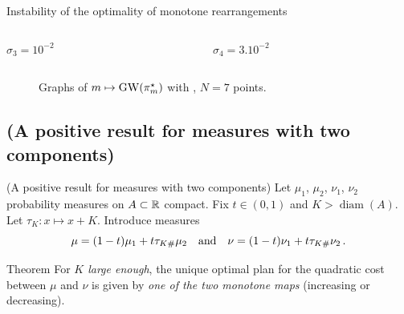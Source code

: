\documentclass[9pt,xcolor={dvipsnames}]{beamer}
\begin{document}
\begin{frame}{Instability of the optimality of monotone rearrangements}
{\begin{columns}
\begin{column}[b]{.24\linewidth}
            \centering
            
            \vspace{-8mm}
            \begin{center}{\scriptsize $\sigma_3=10^{-2}$}\end{center}
        \end{column}
        \begin{column}[b]{.24\linewidth}
            \centering
            
            \vspace{-8mm}
            \begin{center}{\scriptsize $\sigma_4=3.10^{-2}$}\end{center}
        \end{column}
    \end{columns}
    \begin{figure}[h]
        \caption{Graphs of $m\mapsto \operatorname{GW}(\pi^\star_m)$ with \cite{beinert2022assignment}, $N=7$ points.}
    \end{figure}}
\end{frame}


\subsection{(A positive result for measures with two components)}
    \begin{frame}{(A positive result for measures with two components)}
        Let $\mu_1$, $\mu_2$, $\nu_1$, $\nu_2$ probability measures on $A \subset \mathbb{R}$ compact. Fix $t \in (0,1)$ and $K > \operatorname{diam}(A)$. Let $\tau_K : x \mapsto x + K$. Introduce measures
    \begin{equation*}
    \mu = (1-t) \mu_1 + t \tau_{K\#} \mu_2 \quad \text{and}  \quad \nu = (1-t) \nu_1 + t \tau_{K\#} \nu_2\,.
    \end{equation*}

    \begin{figure}[h]
        \centering
        
    \end{figure}

    \begin{block}{Theorem}
        For \emph{$K$ large enough}, the unique optimal plan for the quadratic cost between  $\mu$ and $\nu$ is given by \emph{one of the two monotone maps} (increasing or decreasing).
    \end{block}


\end{frame}
\end{document}
